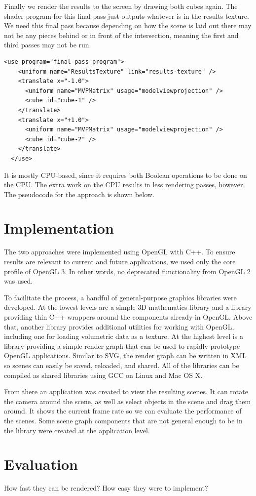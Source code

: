 \documentclass{article}
\begin{document}
Finally we render the results to the screen by drawing both cubes again.  The
shader program for this final pass just outputs whatever is in the results
texture.  We need this final pass because depending on how the scene is laid out
there may not be any pieces behind or in front of the intersection, meaning the
first and third passes may not be run.

\begin{Verbatim}[fontsize=\small]
  <use program="final-pass-program">
    <uniform name="ResultsTexture" link="results-texture" />
    <translate x="-1.0">
      <uniform name="MVPMatrix" usage="modelviewprojection" />
      <cube id="cube-1" />
    </translate>
    <translate x="+1.0">
      <uniform name="MVPMatrix" usage="modelviewprojection" />
      <cube id="cube-2" />
    </translate>
  </use>
\end{Verbatim}

It is mostly CPU-based, since it requires both Boolean operations to be done on
the CPU.  The extra work on the CPU results in less rendering passes, however.
The pseudocode for the approach is shown below.

\section{Implementation}

The two approaches were implemented using OpenGL with C++.  To ensure results
are relevant to current and future applications, we used only the core profile
of OpenGL 3.  In other words, no deprecated functionality from OpenGL 2 was
used.

To facilitate the process, a handful of general-purpose graphics libraries were
developed.  At the lowest levels are a simple 3D mathematics library and a
library providing thin C++ wrappers around the components already in OpenGL.
Above that, another library provides additional utilities for working with
OpenGL, including one for loading volumetric data as a texture.  At the highest
level is a library providing a simple render graph that can be used to rapidly
prototype OpenGL applications.  Similar to SVG, the render graph can be written
in XML so scenes can easily be saved, reloaded, and shared.  All of the
libraries can be compiled as shared libraries using GCC on Linux and Mac OS X.

From there an application was created to view the resulting scenes.  It can
rotate the camera around the scene, as well as select objects in the scene and
drag them around.  It shows the current frame rate so we can evaluate the
performance of the scenes.  Some scene graph components that are not general
enough to be in the library were created at the application level.

\section{Evaluation}

How fast they can be rendered?
How easy they were to implement?


\newpage


\end{document}
